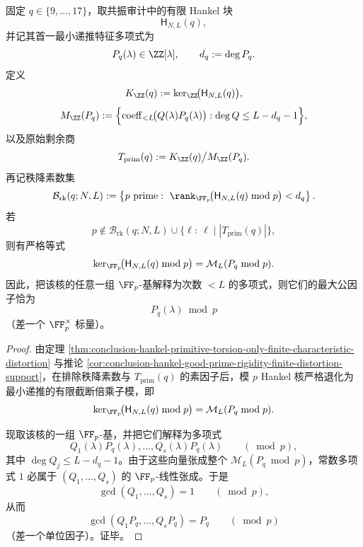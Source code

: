 \begin{theorem}\label{thm:conclusion-resonance-window-goodprime-exact-modp-recovery}
固定 \(q\in\{9,\dots,17\}\)，取共振审计中的有限 Hankel 块
\[
\mathsf H_{N,L}(q),
\]
并记其首一最小递推特征多项式为
\[
P_q(\lambda)\in \ZZ[\lambda],
\qquad
d_q:=\deg P_q.
\]
定义
\[
K_{\ZZ}(q):=\ker_{\ZZ}\!\bigl(\mathsf H_{N,L}(q)\bigr),
\]
\[
M_{\ZZ}(P_q):=
\Bigl\{
\operatorname{coeff}_{<L}\!\bigl(Q(\lambda)P_q(\lambda)\bigr):
\deg Q\le L-d_q-1
\Bigr\},
\]
以及原始剩余商
\[
T_{\mathrm{prim}}(q):=K_{\ZZ}(q)\big/M_{\ZZ}(P_q).
\]
再记秩降素数集
\[
\mathcal B_{\mathrm{rk}}(q;N,L):=
\left\{
p\ \text{prime}:\ \rank_{\FF_p}\!\bigl(\mathsf H_{N,L}(q)\bmod p\bigr)<d_q
\right\}.
\]
若
\[
p\notin
\mathcal B_{\mathrm{rk}}(q;N,L)
\cup
\{\ell:\ \ell\mid |T_{\mathrm{prim}}(q)|\},
\]
则有严格等式
\[
\ker_{\FF_p}\!\bigl(\mathsf H_{N,L}(q)\bmod p\bigr)
=
\mathcal M_L(P_q\bmod p).
\]
因此，把该核的任意一组 \(\FF_p\)-基解释为次数 \(<L\) 的多项式，则它们的最大公因子恰为
\[
P_q(\lambda)\bmod p
\]
（差一个 \(\FF_p^\times\) 标量）。
\end{theorem}
\begin{proof}
由定理 \ref{thm:conclusion-hankel-primitive-torsion-only-finite-characteristic-distortion} 与推论 \ref{cor:conclusion-hankel-good-prime-rigidity-finite-distortion-support}，在排除秩降素数与 \(T_{\mathrm{prim}}(q)\) 的素因子后，模 \(p\) Hankel 核严格退化为最小递推的有限截断倍乘子模，即
\[
\ker_{\FF_p}\!\bigl(\mathsf H_{N,L}(q)\bmod p\bigr)
=
\mathcal M_L(P_q\bmod p).
\]

现取该核的一组 \(\FF_p\)-基，并把它们解释为多项式
\[
Q_1(\lambda)P_q(\lambda),\dots,Q_s(\lambda)P_q(\lambda)
\qquad (\bmod p),
\]
其中 \(\deg Q_j\le L-d_q-1\)。由于这些向量张成整个 \(\mathcal M_L(P_q\bmod p)\)，常数多项式 \(1\) 必属于 \((Q_1,\dots,Q_s)\) 的 \(\FF_p\)-线性张成。于是
\[
\gcd(Q_1,\dots,Q_s)=1
\qquad (\bmod p),
\]
从而
\[
\gcd(Q_1P_q,\dots,Q_sP_q)=P_q
\qquad (\bmod p)
\]
（差一个单位因子）。证毕。
\end{proof}

